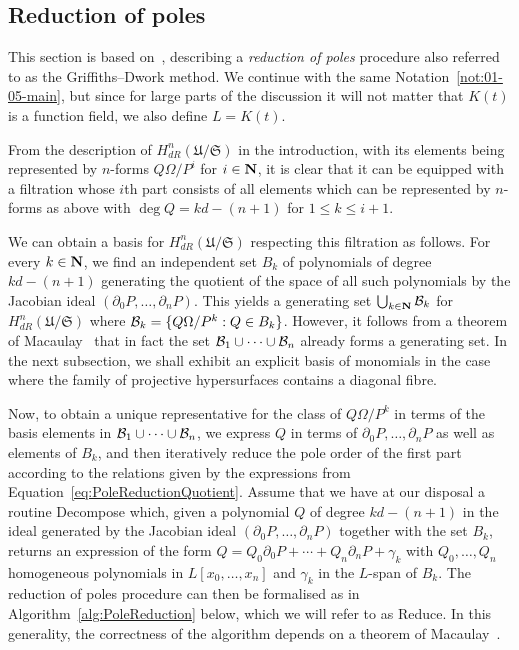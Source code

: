 \subsection{Reduction of poles}
\label{sec:01-05-reduction}

This section is based on~\citep[Remark~3.2.5]{AbbottKedlayaRoe2006}, 
describing a \emph{reduction of poles} procedure also referred to as the 
Griffiths--Dwork method.  We continue with the same 
Notation~\ref{not:01-05-main}, but since for large parts of the discussion 
it will not matter that $K(t)$ is a function field, we also define $L = K(t)$.

From the description of $H_{dR}^n(\mathfrak{U}/\mathfrak{S})$ in the 
introduction, with its elements being represented by $n$-forms 
$Q \Omega / P^i$ for $i \in \mathbf{N}$, it is clear that it can be equipped 
with a filtration whose $i$th part consists of all elements which can 
be represented by $n$-forms as above with $\deg Q = k d - (n+1)$ for 
$1 \leq k \leq i+1$.

We can obtain a basis for $H_{dR}^n(\mathfrak{U}/\mathfrak{S})$ 
respecting this filtration as follows.  For every $k \in \mathbf{N}$, we find 
an independent set $B_k$ of polynomials of degree $kd-(n+1)$ generating 
the quotient of the space of all such polynomials by the Jacobian ideal 
$(\partial_0 P, \dotsc, \partial_n P)$.  This yields a generating set 
$\bigcup_{k \in \mathbf{N}} \mathcal{B}_k$ for $H_{dR}^n(\mathfrak{U}/\mathfrak{S})$ where 
$\mathcal{B}_k = \{Q \Omega / P^k : Q \in B_k\}$.  However, it follows from a 
theorem of Macaulay~\citep[\S 4, (4.11)]{Griffiths1969} that in fact 
the set $\mathcal{B}_1 \cup \dotsb \cup \mathcal{B}_n$ already forms a generating set.  In 
the next subsection, we shall exhibit an explicit basis of monomials in the 
case where the family of projective hypersurfaces contains a diagonal fibre.

Now, to obtain a unique representative for the class of $Q \Omega / P^k$ 
in terms of the basis elements in $\mathcal{B}_1 \cup \dotsb \cup \mathcal{B}_n$, we 
express $Q$ in terms of $\partial_0 P, \dotsc, \partial_n P$ as well as 
elements of $B_k$, and then iteratively reduce the pole order of the first 
part according to the relations given by the expressions from 
Equation~\eqref{eq:PoleReductionQuotient}.  Assume that we have at our 
disposal a routine {\sc Decompose} which, given a polynomial $Q$ of degree 
$kd - (n+1)$ in the ideal generated by the Jacobian ideal 
$(\partial_0 P, \dotsc, \partial_n P)$ together with the set $B_k$, returns an 
expression of the form 
$Q = Q_0 \partial_0 P + \dotsb + Q_n \partial_n P + \gamma_k$ with 
$Q_0, \dotsc, Q_n$ homogeneous polynomials in $L[x_0, \dotsc, x_n]$ and 
$\gamma_k$ in the $L$-span of $B_k$.  The reduction of poles procedure can 
then be formalised as in Algorithm~\ref{alg:PoleReduction} below, which we 
will refer to as {\sc Reduce}.  In this generality, the correctness of the 
algorithm depends on a theorem of Macaulay~\citep[\S 4, (4.11)]{Griffiths1969}.

